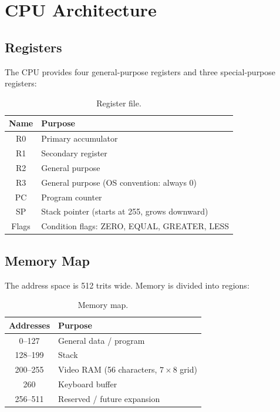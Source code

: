 \documentclass[11pt,a4paper]{article}
\begin{document}
\section{CPU Architecture}
\label{sec:cpu}

\subsection{Registers}

The CPU provides four general-purpose registers and three special-purpose
registers:

\begin{table}[H]
  \centering
  \caption{Register file.}
  \label{tab:registers}
  \begin{tabular}{c|l}
    \textbf{Name} & \textbf{Purpose} \\ \hline
    R0   & Primary accumulator \\
    R1   & Secondary register \\
    R2   & General purpose \\
    R3   & General purpose (OS convention: always 0) \\
    PC   & Program counter \\
    SP   & Stack pointer (starts at 255, grows downward) \\
    Flags & Condition flags: ZERO, EQUAL, GREATER, LESS
  \end{tabular}
\end{table}

\subsection{Memory Map}

The address space is 512 trits wide.  Memory is divided into regions:

\begin{table}[H]
  \centering
  \caption{Memory map.}
  \label{tab:memory}
  \begin{tabular}{c|l}
    \textbf{Addresses} & \textbf{Purpose} \\ \hline
    0--127   & General data / program \\
    128--199 & Stack \\
    200--255 & Video RAM (56 characters, $7 \times 8$ grid) \\
    260      & Keyboard buffer \\
    256--511 & Reserved / future expansion
  \end{tabular}
\end{table}
\end{document}
